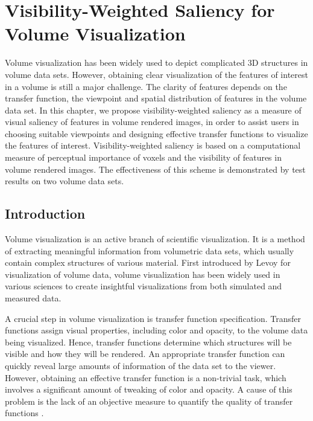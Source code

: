 \chapter{Visibility-Weighted Saliency for Volume Visualization \label{visibility-weighted_saliency}}
Volume visualization has been widely used to depict complicated 3D structures in volume data sets.
However, obtaining clear visualization of the features of interest in a volume is still a major challenge.
The clarity of features depends on the transfer function, the viewpoint and spatial distribution of features in the volume data set.
In this chapter, we propose visibility-weighted saliency as a measure of visual saliency of features in volume rendered images, in order to assist users in choosing suitable viewpoints and designing effective transfer functions to visualize the features of interest. Visibility-weighted saliency is based on a computational measure of perceptual importance of voxels and the visibility of features in volume rendered images.
The effectiveness of this scheme is demonstrated by test results on two volume data sets.

\section{Introduction}
Volume visualization is an active branch of scientific visualization. It is a method of extracting meaningful information from volumetric data sets, which usually contain complex structures of various material.
First introduced by Levoy \cite{levoy_display_1988} for visualization of volume data, volume visualization has been widely used in various sciences to create insightful visualizations from both simulated and measured data.

A crucial step in volume visualization is transfer function specification. Transfer functions assign visual properties, including color and opacity, to the volume data being visualized. Hence, transfer functions determine which structures will be visible and how they will be rendered.
An appropriate transfer function can quickly reveal large amounts of information of the data set to the viewer.
However, obtaining an effective transfer function is a non-trivial task, which involves a significant amount of tweaking of color and opacity.
A cause of this problem is the lack of an objective measure to quantify the quality of transfer functions \cite{correa_visibility_2011}.

